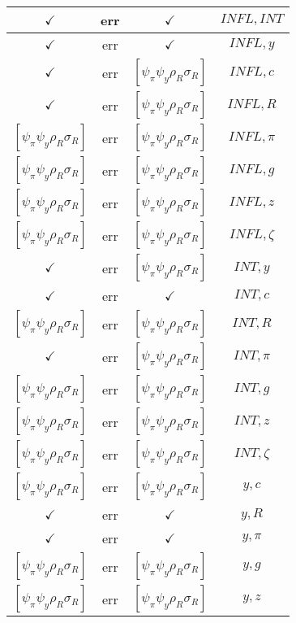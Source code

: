 \documentclass[a4paper,10pt]{article}
\begin{document}
\begin{longtable}{|c|c|c|c|}
\hline
$\checkmark$ & err & $\checkmark$ & ${INFL},{INT}$ \\
\hline
$\checkmark$ & err & $\checkmark$ & ${INFL},{y}$ \\
\hline
$\checkmark$ & err & $[\psi_\pi \psi_y \rho_R \sigma_R ]$ & ${INFL},{c}$ \\
\hline
$\checkmark$ & err & $[\psi_\pi \psi_y \rho_R \sigma_R ]$ & ${INFL},{R}$ \\
\hline
$[\psi_\pi \psi_y \rho_R \sigma_R ]$ & err & $[\psi_\pi \psi_y \rho_R \sigma_R ]$ & ${INFL},{\pi}$ \\
\hline
$[\psi_\pi \psi_y \rho_R \sigma_R ]$ & err & $[\psi_\pi \psi_y \rho_R \sigma_R ]$ & ${INFL},{g}$ \\
\hline
$[\psi_\pi \psi_y \rho_R \sigma_R ]$ & err & $[\psi_\pi \psi_y \rho_R \sigma_R ]$ & ${INFL},{z}$ \\
\hline
$[\psi_\pi \psi_y \rho_R \sigma_R ]$ & err & $[\psi_\pi \psi_y \rho_R \sigma_R ]$ & ${INFL},{\zeta}$ \\
\hline
$\checkmark$ & err & $[\psi_\pi \psi_y \rho_R \sigma_R ]$ & ${INT},{y}$ \\
\hline
$\checkmark$ & err & $\checkmark$ & ${INT},{c}$ \\
\hline
$[\psi_\pi \psi_y \rho_R \sigma_R ]$ & err & $[\psi_\pi \psi_y \rho_R \sigma_R ]$ & ${INT},{R}$ \\
\hline
$\checkmark$ & err & $[\psi_\pi \psi_y \rho_R \sigma_R ]$ & ${INT},{\pi}$ \\
\hline
$[\psi_\pi \psi_y \rho_R \sigma_R ]$ & err & $[\psi_\pi \psi_y \rho_R \sigma_R ]$ & ${INT},{g}$ \\
\hline
$[\psi_\pi \psi_y \rho_R \sigma_R ]$ & err & $[\psi_\pi \psi_y \rho_R \sigma_R ]$ & ${INT},{z}$ \\
\hline
$[\psi_\pi \psi_y \rho_R \sigma_R ]$ & err & $[\psi_\pi \psi_y \rho_R \sigma_R ]$ & ${INT},{\zeta}$ \\
\hline
$[\psi_\pi \psi_y \rho_R \sigma_R ]$ & err & $[\psi_\pi \psi_y \rho_R \sigma_R ]$ & ${y},{c}$ \\
\hline
$\checkmark$ & err & $\checkmark$ & ${y},{R}$ \\
\hline
$\checkmark$ & err & $\checkmark$ & ${y},{\pi}$ \\
\hline
$[\psi_\pi \psi_y \rho_R \sigma_R ]$ & err & $[\psi_\pi \psi_y \rho_R \sigma_R ]$ & ${y},{g}$ \\
\hline
$[\psi_\pi \psi_y \rho_R \sigma_R ]$ & err & $[\psi_\pi \psi_y \rho_R \sigma_R ]$ & ${y},{z}$ \\
\hline

\end{longtable}
\end{document}
